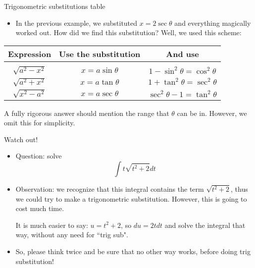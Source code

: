 \begin{frame}{Trigonometric substitutions table}
    \begin{itemize}
        \item In the previous example, we substituted $x=2\sec\theta$ and everything magically worked out. How did we find this substitution? Well, we used this scheme:
        \end{itemize}

        \begin{tcolorbox}[colback=yellow!50,colframe=violet!85!black,title=Trigonometric substitutions for integration]
        \begin{tabular}{ |c|c|c| } 
         \hline
         Expression & Use the substitution & And use \\
         \hline\hline&&\\[-2.2ex]
         $\sqrt{a^2-x^2}$ & $x=a\sin\theta$ & $1-\sin^2\theta=\cos^2\theta$ \\ 
         $\sqrt{a^2+x^2}$ & $x=a\tan\theta$ & $1+\tan^2\theta=\sec^2\theta$ \\ 
         $\sqrt{x^2-a^2}$ & $x=a\sec\theta$ & $\sec^2\theta-1=\tan^2\theta$\\ 
         \hline
         
        \end{tabular}
        
        \vspace{3mm}
        {\small A fully rigorous answer should mention the range that $\theta$ can be in. However, we omit this for simplicity.}
        \end{tcolorbox}
    
\end{frame}

\begin{frame}{Watch out!}
    \begin{itemize}
        \item Question: solve \[\int t\sqrt{t^2+2}dt\]
        \item\pause Observation: we recognize that this integral contains the term $\sqrt{t^2+2}$, thus we could try to make a trigonometric substitution. \pause However, this is going to cost much time.

        It is much easier to say: $u=t^2+2$, so $du=2tdt$ and solve the integral that way, without any need for ``trig sub".

        \pause\item So, please think twice and be sure that no other way works, before doing trig substitution!
    \end{itemize}
\end{frame}

